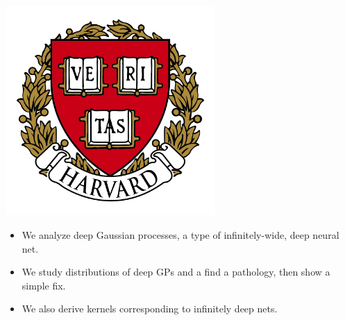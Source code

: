 \documentclass[portrait,a0b,final,a4resizeable]{include/a0poster}
\begin{document}
\begin{poster}
\begin{center}
\begin{pcolumn}{0.99}
{%
%
\begin{minipage}[c]{\logowidth}
  \begin{flushright}
    \includegraphics[width=8cm,trim=2em 0em 2em 2em, clip]{badges/harvard}
  \end{flushright}
\end{minipage}
%
}
\end{pcolumn}
\end{center}

\vspace*{0.5cm}

\large




\begin{multicols}{2}





\begin{itemize}
	\item We analyze deep Gaussian processes, a type of infinitely-wide, deep neural net.
	\item We study distributions of deep GPs and a find a pathology, then show a simple fix.
	\item We also derive kernels corresponding to infinitely deep nets.
\end{itemize}

\vspace{0.5in}


\end{multicols}
\end{poster}
\end{document}
